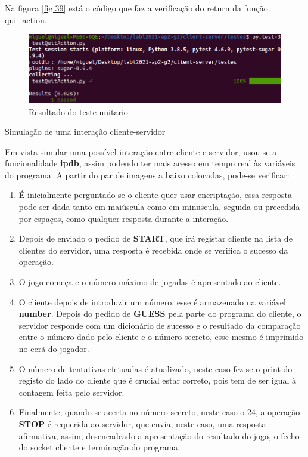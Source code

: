 \documentclass{report}
\newenvironment{changemargin}[2]{%
\begin{list}{}{%
\setlength{\topsep}{0pt}%
\setlength{\leftmargin}{#1}%
\setlength{\rightmargin}{#2}%
\setlength{\listparindent}{\parindent}%
\setlength{\itemindent}{\parindent}%
\setlength{\parsep}{\parskip}%
}%
\item[]}{\end{list}}
\theoremstyle{remark}
\begin{document}
{Na figura \ref{fig:39} está o código que faz a verificação do return da função qui\_action.


\begin{figure}[H]
\begin{changemargin}{-3.5cm}{-3.5cm}
\center
\includegraphics[width = 15 cm ]{testQuitAction_result.png}
\caption{Resultado do teste unitario}
\end{changemargin}
\end{figure}

\begin{section}{Simulação de uma interação cliente-servidor}
\label{sec.simulação}

Em vista simular uma possível interação entre cliente e servidor, usou-se a funcionalidade \textbf{\ac{ipdb}}, assim podendo ter mais acesso em tempo real às variáveis do programa. A partir do par de imagens a baixo colocadas, pode-se verificar:
\begin{enumerate}
\item É inicialmente perguntado se o cliente quer usar encriptação, essa resposta pode ser dada tanto em maiúscula como em minuscula, seguida ou precedida por espaços, como qualquer resposta durante a interação.
\item Depois de enviado o pedido de \textbf{START}, que irá registar cliente na lista de clientes do servidor, uma resposta é recebida onde se verifica o sucesso da operação.
\item O jogo começa e o número máximo de jogadas é apresentado ao cliente.
\item O cliente depois de introduzir um número, esse é armazenado na variável \textbf{number}. Depois do pedido de \textbf{GUESS} pela parte do programa do cliente, o servidor responde com um dicionário de sucesso e o resultado da comparação entre o número dado pelo cliente e o número secreto, esse mesmo é imprimido no ecrã do jogador.
\item O número de tentativas efetuadas é atualizado, neste caso fez-se o print do registo do lado do cliente que é crucial estar correto, pois tem de ser igual à contagem feita pelo servidor.
\item Finalmente, quando se acerta no número secreto, neste caso o 24, a operação \textbf{STOP} é requerida ao servidor, que envia, neste caso, uma resposta afirmativa, assim, desencadeado a apresentação do resultado do jogo, o fecho do socket cliente e terminação do programa.


\end{enumerate}
\end{section}}
\end{document}
